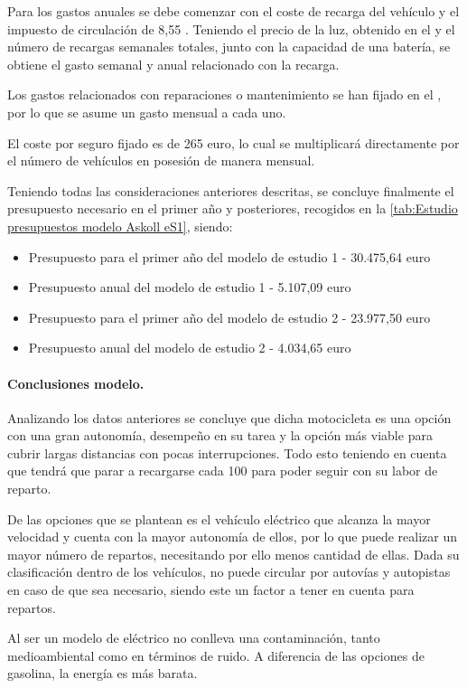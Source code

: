 Para los gastos anuales se debe comenzar con el coste de recarga del vehículo y el impuesto de circulación de 8,55 . Teniendo el precio de la luz, obtenido en el  y el número de recargas semanales totales, junto con la capacidad de una batería, se obtiene el gasto semanal y anual relacionado con la recarga.

Los gastos relacionados con reparaciones o mantenimiento se han fijado en el , por lo que se asume un gasto mensual a cada uno. 

El coste por seguro fijado es de 265 \gls{euro}, lo cual se multiplicará directamente por el número de vehículos en posesión de manera mensual.

Teniendo todas las consideraciones anteriores descritas, se concluye finalmente el presupuesto necesario en el primer año y posteriores, recogidos en la \autoref{tab:Estudio presupuestos modelo Askoll eS1}, siendo:

\begin{itemize}
    \item Presupuesto para el primer año del modelo de estudio 1 - 30.475,64 \gls{euro}
    \item Presupuesto anual del modelo de estudio 1 - 5.107,09 \gls{euro}
    \item Presupuesto para el primer año del modelo de estudio 2 - 23.977,50 \gls{euro}
    \item Presupuesto anual del modelo de estudio 2 - 4.034,65 \gls{euro}
\end{itemize}

\paragraph{Conclusiones modelo.}

Analizando los datos anteriores se concluye que dicha motocicleta es una opción con una gran autonomía, desempeño en su tarea y la opción más viable para cubrir largas distancias con pocas interrupciones. Todo esto teniendo en cuenta que tendrá que parar a recargarse cada 100  para poder seguir con su labor de reparto.

De las opciones que se plantean es el vehículo eléctrico que alcanza la mayor velocidad y cuenta con la mayor autonomía de ellos, por lo que puede realizar un mayor número de repartos, necesitando por ello menos cantidad de ellas. Dada su clasificación dentro de los vehículos, no puede circular por autovías y autopistas en caso de que sea necesario, siendo este un factor a tener en cuenta para repartos.

Al ser un modelo de eléctrico no conlleva una contaminación, tanto medioambiental como en términos de ruido. A diferencia de las opciones de gasolina, la energía es más barata.